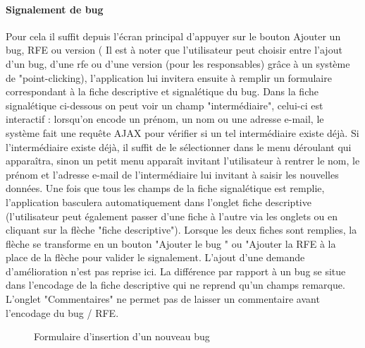 \documentclass{article}[12pt]
\begin{document}
\paragraph{Signalement de bug}Pour cela il  suffit depuis l'écran principal d'appuyer sur le bouton \og Ajouter un bug, RFE  ou version \fg ( Il est à noter que l'utilisateur peut choisir entre l'ajout d'un bug, d'une rfe ou d'une version (pour les responsables) grâce à un système de "point-clicking), l'application lui invitera ensuite à remplir un formulaire correspondant à la fiche descriptive et signalétique du bug. 
\newline
\newline
Dans la fiche signalétique ci-dessous on peut voir un champ "intermédiaire", celui-ci est interactif : lorsqu'on encode un prénom, un nom ou une adresse e-mail, le système fait une requête AJAX pour vérifier si un tel intermédiaire existe déjà. Si l'intermédiaire existe déjà, il suffit de le sélectionner dans le menu déroulant qui apparaîtra, sinon un petit menu apparaît invitant l'utilisateur à rentrer le nom, le prénom et l'adresse e-mail de l'intermédiaire lui invitant à saisir les nouvelles données.
\newline
\newline
Une fois que tous les champs de la fiche signalétique est remplie, l'application basculera automatiquement dans l'onglet fiche descriptive (l'utilisateur peut également passer d'une fiche à l'autre via les onglets ou en cliquant sur la flèche "fiche descriptive"). Lorsque les deux fiches sont remplies, la flèche se transforme en un bouton "Ajouter le bug " ou "Ajouter la RFE à la place de la flèche pour valider le signalement.
\newline
\newline
L'ajout d'une demande d'amélioration n'est pas reprise ici. La différence par rapport à un bug se situe dans l'encodage de la fiche descriptive qui ne reprend qu'un champs remarque.
\newline
\newline
L'onglet "Commentaires" ne permet pas de laisser un commentaire avant l'encodage du bug / RFE.

\begin{figure}[H]
	\centering
    \caption{Formulaire d'insertion d'un nouveau bug}
\end{figure}
\end{document}
